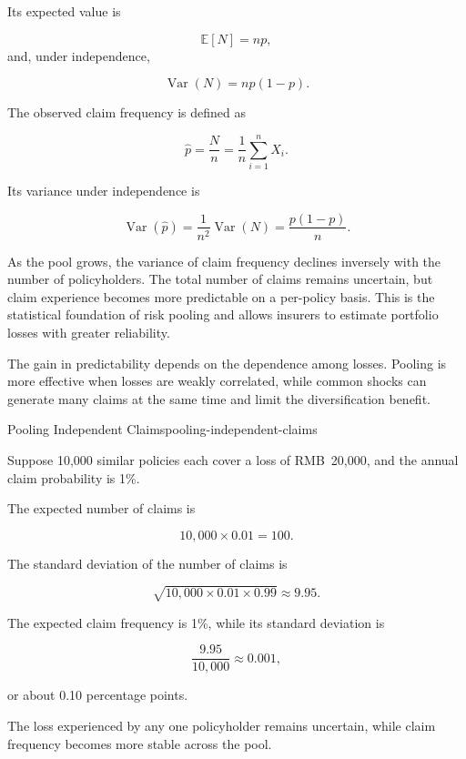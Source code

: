 Its expected value is

\begin{equation}
\mathbb{E}[N]=np,
\label{eq:ch15-expected-claims}
\end{equation}
and, under independence,

\begin{equation}
\operatorname{Var}(N)=np(1-p).
\label{eq:ch15-claims-variance}
\end{equation}

The observed claim frequency is defined as

\begin{equation}
\hat p=\frac{N}{n}
=\frac{1}{n}\sum_{i=1}^{n}X_i.
\end{equation}

Its variance under independence is

\begin{equation}
\operatorname{Var}(\hat p)
=\frac{1}{n^2}\operatorname{Var}(N)=\frac{p(1-p)}{n}.
\label{eq:ch15-frequency-variance}
\end{equation}

As the pool grows, the variance of claim frequency declines
inversely with the number of policyholders. The total number
of claims remains uncertain, but claim experience becomes
more predictable on a per-policy basis. This is the
statistical foundation of risk pooling and allows insurers
to estimate portfolio losses with greater reliability.

The gain in predictability depends on the dependence among
losses. Pooling is more effective when losses are weakly
correlated, while common shocks can generate many claims
at the same time and limit the diversification benefit.

\begin{example}{Pooling Independent Claims}{pooling-independent-claims}

Suppose 10,000 similar policies each cover a loss of RMB~20,000, and the annual claim probability is 1\%.

The expected number of claims is

$$
10{,}000\times 0.01=100.
$$

The standard deviation of the number of claims is

$$
\sqrt{10{,}000\times 0.01\times 0.99}
\approx 9.95.
$$

The expected claim frequency is 1\%, while its standard deviation is

$$
\frac{9.95}{10{,}000}
\approx 0.001,
$$

or about 0.10 percentage points.

The loss experienced by any one policyholder remains uncertain, while claim frequency becomes more stable across the pool.

\end{example}


